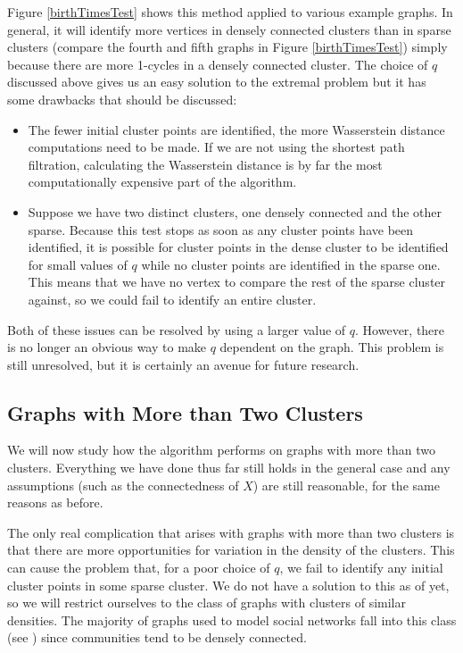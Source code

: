 \documentclass[12pt,a4paper]{amsart}
\numberwithin{equation}{section}
\theoremstyle{plain}
\theoremstyle{definition}
\begin{document}
Figure \ref{birthTimesTest} shows this method applied to various example graphs. In general, it will identify more vertices in densely connected clusters than in sparse clusters (compare the fourth and fifth graphs in Figure \ref{birthTimesTest}) simply because there are more 1-cycles in a densely connected cluster. The choice of $q$ discussed above gives us an easy solution to the extremal problem but it has some drawbacks that should be discussed: 
\begin{itemize}
	\item The fewer initial cluster points are identified, the more Wasserstein distance computations need to be made. If we are not using the shortest path filtration, calculating the Wasserstein distance is by far the most computationally expensive part of the algorithm.
	\item Suppose we have two distinct clusters, one densely connected and the other sparse. Because this test stops as soon as any cluster points have been identified, it is possible for cluster points in the dense cluster to be identified for small values of $q$ while no cluster points are identified in the sparse one. This means that we have no vertex to compare the rest of the sparse cluster against, so we could fail to identify an entire cluster.
\end{itemize}

Both of these issues can be resolved by using a larger value of $q$. However, there is no longer an obvious way to make $q$ dependent on the graph. This problem is still unresolved, but it is certainly an avenue for future research.

\subsection*{Graphs with More than Two Clusters}

We will now study how the algorithm performs on graphs with more than two clusters. Everything we have done thus far still holds in the general case and any assumptions (such as the connectedness of $X$) are still reasonable, for the same reasons as before.

The only real complication that arises with graphs with more than two clusters is that there are more opportunities for variation in the density of the clusters. This can cause the problem that, for a poor choice of $q$, we fail to identify any initial cluster points in some sparse cluster. We do not have a solution to this as of yet, so we will restrict ourselves to the class of graphs with clusters of similar densities. The majority of graphs used to model social networks fall into this class (see \cite{socialModels}) since communities tend to be densely connected.
\end{document}
